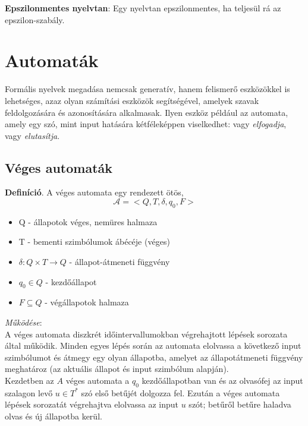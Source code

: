 \documentclass[12pt,margin=0px]{article}
\begin{document}
    \noindent \textbf{Epszilonmentes nyelvtan}: Egy nyelvtan epszilonmentes, ha teljesül rá az epszilon-szabály.
						
	\section*{Automaták}

    Formális nyelvek megadása nemcsak generatív, hanem felismerő eszközökkel is lehetséges, azaz olyan számítási eszközök segítségével, amelyek szavak feldolgozására és azonosítására alkalmasak.
	Ilyen eszköz például az automata, amely egy szó, mint input hatására kétféleképpen viselkedhet: vagy \emph{elfogadja}, vagy \emph{elutasítja}.
	
    \subsection*{Véges automaták}
	
	\noindent \textbf{Definíció}. A véges automata egy rendezett ötös,
		\[
            \mathcal{A}=\Big<Q,T,\delta,q_0, F\Big>
        \]
		\begin{itemize}
			\item Q - állapotok véges, nemüres halmaza
			\item T - bementi szimbólumok ábécéje (véges)
			\item $\delta : Q \times T \rightarrow Q$ - állapot-átmeneti függvény
			\item $q_0 \in Q$ - kezdőállapot
			\item $F \subseteq Q$ - végállapotok halmaza
		\end{itemize}
							
	\noindent \emph{Működése}:\\

    \noindent A véges automata diszkrét időintervallumokban végrehajtott lépések sorozata által működik. Minden egyes lépés során az automata elolvassa a következő input szimbólumot és átmegy egy olyan állapotba, amelyet az állapotátmeneti függvény meghatároz (az aktuális állapot és input szimbólum alapján).\\
							
    \noindent Kezdetben az $A$ véges automata a $q_0$ kezdőállapotban van és az olvasófej az input szalagon levő $u \in T^*$ szó első betűjét dolgozza fel. Ezután a véges automata lépések sorozatát végrehajtva elolvassa az input $u$ szót; betűről betűre haladva olvas és új állapotba kerül.\\
							
\end{document}
